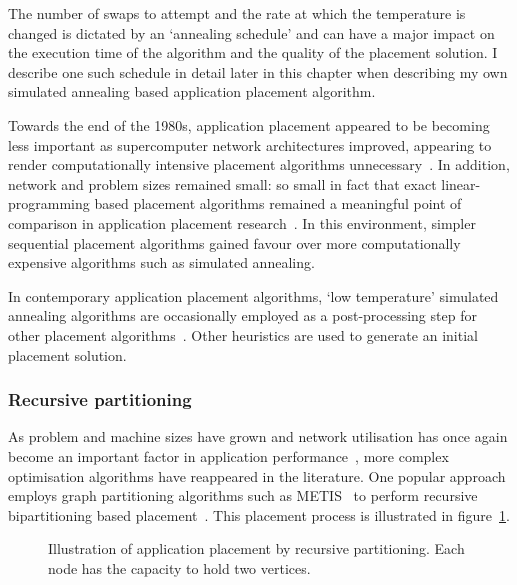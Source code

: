 				The number of swaps to attempt and the rate at which the temperature is
				changed is dictated by an `annealing schedule' and can have a major
				impact on the execution time of the algorithm and the quality of the
				placement solution. I describe one such schedule in detail later in
				this chapter when describing my own simulated annealing based
				application placement algorithm.
				
				Towards the end of the 1980s, application placement appeared to be
				becoming less important as supercomputer network architectures
				improved, appearing to render computationally intensive placement
				algorithms unnecessary~\cite{dally87}.  In addition, network and
				problem sizes remained small: so small in fact that exact
				linear-programming based placement algorithms remained a meaningful
				point of comparison in application placement research~\cite{xu91}. In
				this environment, simpler sequential placement algorithms gained favour
				over more computationally expensive algorithms such as simulated
				annealing.
				
				In contemporary application placement algorithms, `low temperature'
				simulated annealing algorithms are occasionally employed as a
				post-processing step for other placement algorithms~\cite{hoefler11}.
				Other heuristics are used to generate an initial placement solution.
				
			
			\subsubsection{Recursive partitioning}
				
				As problem and machine sizes have grown and network utilisation has
				once again become an important factor in application
				performance~\cite{navaridas09b}, more complex optimisation algorithms
				have reappeared in the literature. One popular approach employs graph
				partitioning algorithms such as METIS~\cite{karypis98} to perform
				recursive bipartitioning based
				placement~\cite{phillips14,hoefler11,pellegrini96}.  This placement
				process is illustrated in figure~\ref{fig:partitioning}.
				
				\begin{figure}
					\center
					
					\caption[Application placement by recursive partitioning.]%
					{Illustration of application placement by recursive
					partitioning. Each node has the capacity to hold two vertices.}
					\label{fig:partitioning}
				\end{figure}
				
